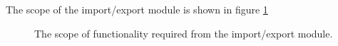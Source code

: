 The scope of the import/export module is shown in figure \ref{fig:importExport_scope}

\begin{figure}[htb]
\begin{center}
\end{center}
\caption{The scope of functionality required from the import/export module. \label{fig:importExport_scope}}
\end{figure}


